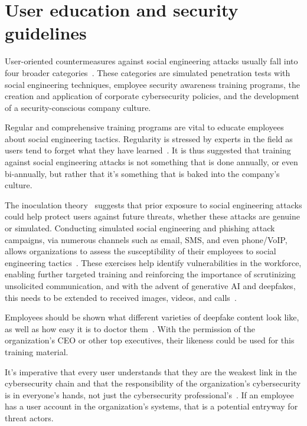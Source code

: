 \section{User education and security guidelines}

User-oriented countermeasures against social engineering attacks usually fall into four broader categories~\citep{tsinganos_Towards_Automated_Recognition_Chat_SE_Enterprise_2018, mitnick_The_Art_of_Deception_2003}. These categories are simulated penetration tests with social engineering techniques, employee security awareness training programs, the creation and application of corporate cybersecurity policies, and the development of a security-conscious company culture.

Regular and comprehensive training programs are vital to educate employees about social engineering tactics. Regularity is stressed by experts in the field as users tend to forget what they have learned~\citep{hadnagy_Social_Engineering_The_Science_2018, mitnick_The_Art_of_Deception_2003}. It is thus suggested that training against social engineering attacks is not something that is done annually, or even bi-annually, but rather that it's something that is baked into the company's culture. 

The inoculation theory~\citep{blauth_AI_Crime_Overview_Malicious_Use_Abuse_2022} suggests that prior exposure to social engineering attacks could help protect users against future threats, whether these attacks are genuine or simulated. Conducting simulated social engineering and phishing attack campaigns, via numerous channels such as email, SMS, and even phone/VoIP, allows organizations to assess the susceptibility of their employees to social engineering tactics~\citep{hadnagy_Social_Engineering_The_Science_2018}. These exercises help identify vulnerabilities in the workforce, enabling further targeted training and reinforcing the importance of scrutinizing unsolicited communication, and with the advent of generative AI and deepfakes, this needs to be extended to received images, videos, and calls~\citep{mirsky_Creation_Detection_Deepfakes_2021}.

Employees should be shown what different varieties of deepfake content look like, as well as how easy it is to doctor them~\citep{mirsky_Creation_Detection_Deepfakes_2021}. With the permission of the organization’s CEO or other top executives, their likeness could be used for this training material.

It's imperative that every user understands that they are the weakest link in the cybersecurity chain and that the responsibility of the organization's cybersecurity is in everyone's hands, not just the cybersecurity professional's~\citep{mitnick_The_Art_of_Deception_2003}. If an employee has a user account in the organization’s systems, that is a potential entryway for threat actors.

